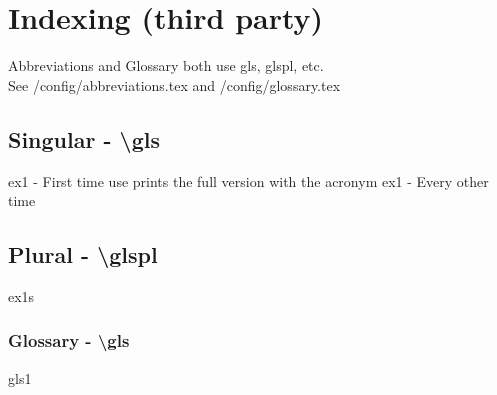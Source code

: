 \section{Indexing (third party)}

Abbreviations and Glossary both use gls, glspl, etc. \\
\noindent
See /config/abbreviations.tex and /config/glossary.tex


\subsection{Singular - \textbackslash gls}
\gls{ex1} - First time use prints the full version with the acronym
\noindent
\gls{ex1} - Every other time


\subsection{Plural - \textbackslash glspl}
\glspl{ex1}


\subsubsection{Glossary - \textbackslash gls}
\gls{gls1}
\\
